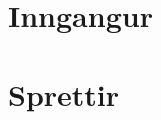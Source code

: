\documentclass{article}
\begin{document}
\tableofcontents
\newpage

\section{Inngangur}

\newpage

\section{Sprettir}
\end{document}
